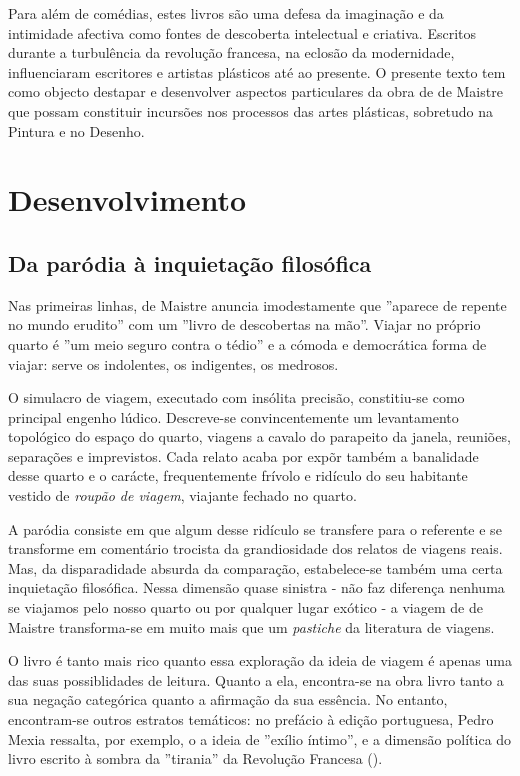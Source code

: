 \documentclass[12pt]{article}
\begin{document}
Para além de comédias, estes livros são uma defesa da imaginação e da
intimidade afectiva como fontes de descoberta intelectual e
criativa. Escritos durante a turbulência da revolução francesa, na
eclosão da modernidade, influenciaram escritores e artistas plásticos
até ao presente. O presente texto tem como objecto destapar e
desenvolver aspectos particulares da obra de de Maistre que possam
constituir incursões nos processos das artes plásticas, sobretudo na
Pintura e no Desenho.

\section{Desenvolvimento}

\subsection{Da paródia à inquietação filosófica}

Nas primeiras linhas, de Maistre anuncia imodestamente que ''aparece
de repente no mundo erudito'' com um ''livro de descobertas na
mão''. Viajar no próprio quarto é ''um meio seguro contra o tédio'' e
a cómoda e democrática forma de viajar: serve os indolentes, os
indigentes, os medrosos.

O simulacro de viagem, executado com insólita precisão, constitiu-se
como principal engenho lúdico. Descreve-se convincentemente um
levantamento topológico do espaço do quarto, viagens a cavalo do
parapeito da janela, reuniões, separações e imprevistos. Cada relato
acaba por expõr também a banalidade desse quarto e o carácte,
frequentemente frívolo e ridículo do seu habitante vestido de
\emph{roupão de viagem}, viajante fechado no quarto.

A paródia consiste em que algum desse ridículo se transfere para o
referente e se transforme em comentário trocista da grandiosidade dos
relatos de viagens reais. Mas, da disparadidade absurda da comparação,
estabelece-se também uma certa inquietação filosófica. Nessa dimensão
quase sinistra - não faz diferença nenhuma se viajamos pelo nosso
quarto ou por qualquer lugar exótico - a viagem de de Maistre
transforma-se em muito mais que um \emph{pastiche} da literatura de
viagens.

O livro é tanto mais rico quanto essa exploração da ideia de viagem é
apenas uma das suas possiblidades de leitura. Quanto a ela,
encontra-se na obra livro tanto a sua negação categórica
\cite{queiros} quanto a afirmação da sua essência. No entanto,
encontram-se outros estratos temáticos: no prefácio à edição
portuguesa, Pedro Mexia ressalta, por exemplo, o a ideia de ''exílio
íntimo'', e a dimensão política do livro escrito à sombra da
''tirania'' da Revolução Francesa (\cite[p.10]{demaistre}).
\end{document}
